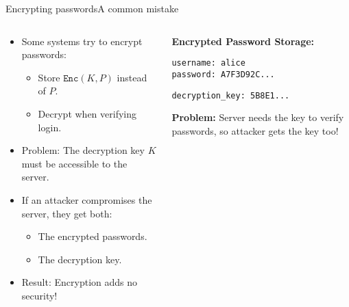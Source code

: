 \documentclass[aspectratio=169, lualatex, handout]{beamer}
\begin{document}
\begin{frame}{Encrypting passwords}{A common mistake}
	\begin{columns}[c]
		\begin{column}{0.55\textwidth}
			\begin{itemize}[<+->]
				\item Some systems try to encrypt passwords:
				      \begin{itemize}
					      \item Store $\texttt{Enc}(K, P)$ instead of $P$.
					      \item Decrypt when verifying login.
				      \end{itemize}
				\item Problem: The decryption key $K$ must be accessible to the server.
				\item If an attacker compromises the server, they get both:
				      \begin{itemize}
					      \item The encrypted passwords.
					      \item The decryption key.
				      \end{itemize}
				\item Result: Encryption adds no security!
			\end{itemize}
		\end{column}
		\begin{column}{0.45\textwidth}
			\begin{tcolorbox}[colback=black!5!white,colframe=ciphergray]
				\textbf{Encrypted Password Storage:}

				\vspace{0.2cm}

				\texttt{username: alice}\\
				\texttt{password: A7F3D92C...}

				\vspace{0.2cm}

				\texttt{decryption\_key: 5B8E1...}

				\vspace{0.3cm}

				\textcolor{cipherprimary}{\textbf{Problem:} \small Server needs the key to verify passwords, so attacker gets the key too!}
			\end{tcolorbox}
		\end{column}
	\end{columns}
\end{frame}
\end{document}
